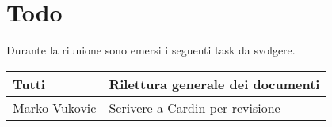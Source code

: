 \section{Todo}
Durante la riunione sono emersi i seguenti task da svolgere.

\begin{center}
  \begin{tabular}{|p{5cm}|p{7cm}|}
    \hline
    Tutti & Rilettura generale dei documenti  \\ \hline
    Marko Vukovic & Scrivere a Cardin per revisione  \\ \hline
  \end{tabular}
\end{center}
